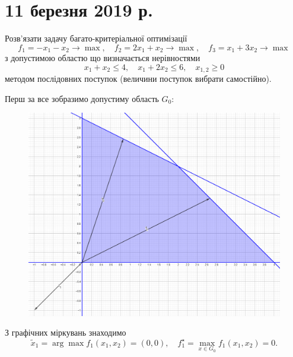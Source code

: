 \section*{11 березня 2019 р.}

\setcounter{problem}{0}

\begin{problem}
    Розв'язати задачу багато-критеріальної оптимізації \[ f_1 = - x_1 - x_2 \to \max, \quad f_2 = 2 x_1 + x_2 \to \max, \quad f_3 = x_1 + 3 x_2 \to \max \] з допустимою областю що визначається нерівностями \[ x_1 + x_2 \le 4, \quad x_1 + 2 x_2 \le 6, \quad x_{1, 2} \ge 0 \] методом послідовних поступок (величини поступок вибрати самостійно).
\end{problem}

\begin{solution}
    Перш за все зобразимо допустиму область $G_0$:
    \begin{figure}[H]
        \centering
        \includegraphics[width=\textwidth]{img/successive_concessions_1_1.png}
    \end{figure}

    З графічних міркувань знаходимо \[ \tilde x_1 = \arg \max f_1(x_1, x_2) = (0, 0), \quad f_1^\star = \max_{x \in G_0} f_1(x_1, x_2) = 0. \]
    

\end{solution}
